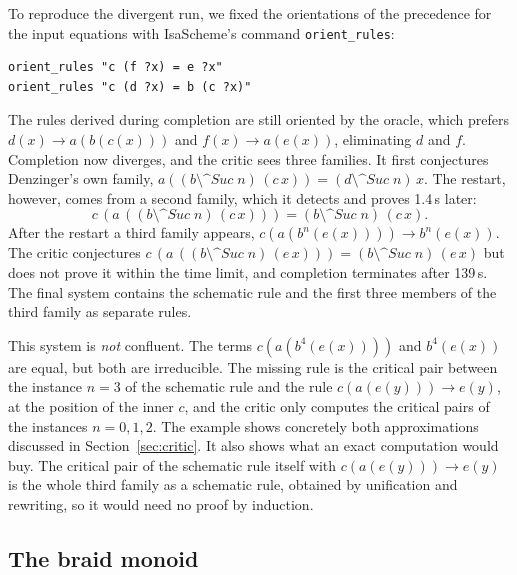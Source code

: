 \documentclass[preprint,12pt]{elsarticle}
\newcommand{\rw}{\to}
\newcommand{\pw}[2]{#1^{#2}}               %
\newcommand{\pp}{\mathbin{\texttt{\^{}\^{}}}}     %
\newcommand{\fp}[2]{(#1 \pp #2)}                  %
\newcommand{\isa}[1]{\texttt{#1}}
\newcommand{\Suc}{\mathit{Suc}}
\begin{document}
To reproduce the divergent run, we fixed the orientations of the
precedence for the input equations with IsaScheme's command
\isa{orient\_rules}:
\begin{lstlisting}
orient_rules "c (f ?x) = e ?x"
orient_rules "c (d ?x) = b (c ?x)"
\end{lstlisting}
The rules derived during completion are still oriented by the oracle,
which prefers $d(x) \rw a(b(c(x)))$ and $f(x) \rw a(e(x))$, eliminating
$d$ and $f$. Completion now diverges, and the critic sees three families.
It first conjectures Denzinger's own family,
$a(\fp{b}{\Suc\;n}\,(c\,x)) = \fp{d}{\Suc\;n}\,x$. The restart, however,
comes from a second family, which it detects and proves 1.4\,s later:
\[
  c\,(a\,(\fp{b}{\Suc\;n}\,(c\,x))) = \fp{b}{\Suc\;n}\,(c\,x).
\] After the restart a third family appears,
$c(a(\pw{b}{n}(e(x)))) \rw \pw{b}{n}(e(x))$. The critic conjectures
$c\,(a\,(\fp{b}{\Suc\;n}\,(e\,x))) = \fp{b}{\Suc\;n}\,(e\,x)$ but does not
prove it within the time limit, and completion terminates after 139\,s.
The final system contains the schematic rule and the first three members
of the third family as separate rules.

This system is \emph{not} confluent. The terms
$c(a(\pw{b}{4}(e(x))))$ and $\pw{b}{4}(e(x))$ are equal, but both are
irreducible. The missing rule is the critical pair between the instance
$n = 3$ of the schematic rule and the rule $c(a(e(y))) \rw e(y)$, at the
position of the inner $c$, and the critic only computes the critical pairs
of the instances $n = 0, 1, 2$. The example shows concretely both
approximations discussed in Section~\ref{sec:critic}. It also shows what an
exact computation would buy. The critical pair of the schematic rule
itself with $c(a(e(y))) \rw e(y)$ is the whole third family as a schematic
rule, obtained by unification and rewriting, so it would need no proof by
induction.

\subsection{The braid monoid}
\end{document}
